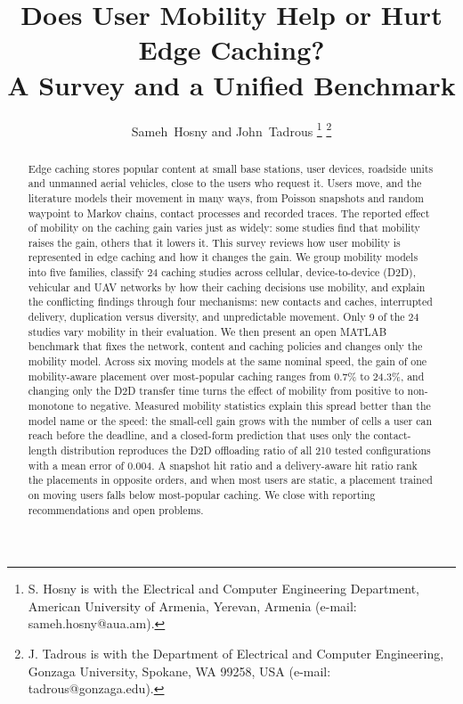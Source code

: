 \documentclass[journal]{IEEEtran}
\begin{document}
\title{Does User Mobility Help or Hurt Edge Caching?\\ A Survey and a Unified Benchmark}

\author{Sameh~Hosny and John~Tadrous%
\thanks{S. Hosny is with the Electrical and Computer Engineering Department, American University of Armenia, Yerevan, Armenia (e-mail: sameh.hosny@aua.am).}%
\thanks{J. Tadrous is with the Department of Electrical and Computer Engineering, Gonzaga University, Spokane, WA 99258, USA (e-mail: tadrous@gonzaga.edu).}}

\maketitle

\begin{abstract}
Edge caching stores popular content at small base stations, user devices, roadside units and unmanned aerial vehicles, close to the users who request it. Users move, and the literature models their movement in many ways, from Poisson snapshots and random waypoint to Markov chains, contact processes and recorded traces. The reported effect of mobility on the caching gain varies just as widely: some studies find that mobility raises the gain, others that it lowers it. This survey reviews how user mobility is represented in edge caching and how it changes the gain. We group mobility models into five families, classify 24 caching studies across cellular, device-to-device (D2D), vehicular and UAV networks by how their caching decisions use mobility, and explain the conflicting findings through four mechanisms: new contacts and caches, interrupted delivery, duplication versus diversity, and unpredictable movement. Only 9 of the 24 studies vary mobility in their evaluation. We then present an open MATLAB benchmark that fixes the network, content and caching policies and changes only the mobility model. Across six moving models at the same nominal speed, the gain of one mobility-aware placement over most-popular caching ranges from 0.7\% to 24.3\%, and changing only the D2D transfer time turns the effect of mobility from positive to non-monotone to negative. Measured mobility statistics explain this spread better than the model name or the speed: the small-cell gain grows with the number of cells a user can reach before the deadline, and a closed-form prediction that uses only the contact-length distribution reproduces the D2D offloading ratio of all 210 tested configurations with a mean error of 0.004. A snapshot hit ratio and a delivery-aware hit ratio rank the placements in opposite orders, and when most users are static, a placement trained on moving users falls below most-popular caching. We close with reporting recommendations and open problems.
\end{abstract}
\end{document}
